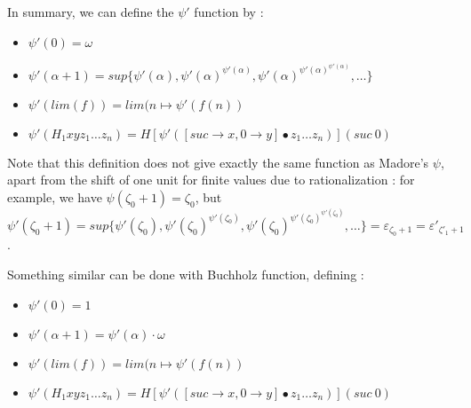 \documentclass[10pt]{article}
\begin{document}
\bigskip

In summary, we can define the \( \psi' \) function by :

\begin{itemize}
     \setlength{\itemsep}{1pt}
     \setlength{\parskip}{0pt}
     \setlength{\parsep}{0pt}

\item \( \psi'(0) = \omega \)

\item \( \psi'(\alpha+1) = sup \lbrace \psi'(\alpha), \psi'(\alpha)^{\psi'(\alpha)}, \psi'(\alpha)^{\psi'(\alpha)^{\psi'(\alpha)}}, \ldots \rbrace \)

\item  \( \psi'(lim(f)) = lim(n \mapsto \psi'(f(n)) \)

\item \( \psi' (H_1 x y z_1 \ldots z_n) = H [\psi'([suc \rightarrow x, 0 \rightarrow y] \bullet z_1 \ldots z_n)] (suc\ 0) \)

\end{itemize}

Note that this definition does not give exactly the same function as Madore's \( \psi \), apart from the shift of one unit for finite values due to rationalization : for example, we have \( \psi(\zeta_0+1) = \zeta_0 \), but \( \psi'(\zeta_0+1) = sup \lbrace \psi'(\zeta_0), \psi'(\zeta_0)^{\psi'(\zeta_0)}, \psi'(\zeta_0)^{\psi'(\zeta_0)^{\psi'(\zeta_0)}}, \ldots \rbrace = \varepsilon_{\zeta_0+1} = \varepsilon'_{\zeta'_1+1} \).

\bigskip

Something similar can be done with Buchholz function, defining :

\begin{itemize}
     \setlength{\itemsep}{1pt}
     \setlength{\parskip}{0pt}
     \setlength{\parsep}{0pt}

\item \( \psi'(0) = 1 \)

\item \( \psi'(\alpha+1) = \psi'(\alpha) \cdot \omega \)

\item \( \psi'(lim(f)) = lim(n \mapsto \psi'(f(n)) \)

\item \( \psi' (H_1 x y z_1 \ldots z_n) = H [\psi'([suc \rightarrow x, 0 \rightarrow y] \bullet z_1 \ldots z_n)] (suc\ 0) \)

\end{itemize}
\end{document}
